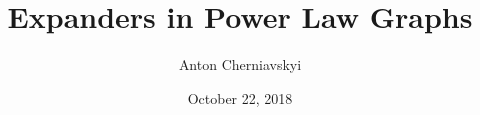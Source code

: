 \documentclass{sfuthesis}
\title{Expanders in Power Law Graphs}
\author{Anton Cherniavskyi}
\date{October 22, 2018}
\theoremstyle{plain}
\theoremstyle{plain}
\theoremstyle{plain}
\theoremstyle{definition}
\begin{document}
\frontmatter
\maketitle{}
\makecommittee{}


\begin{abstract}
    
\end{abstract}

\begin{dedication}
    
\end{dedication}

\begin{acknowledgements}
    
\end{acknowledgements}

%
\tableofcontents%
\clearpage

%
\listoftables%
\clearpage

%
\listoffigures%
\clearpage



%
%

\mainmatter%










%
%
%
%
%

\backmatter%



\begin{appendices} %
%    
    
\end{appendices}
\end{document}
